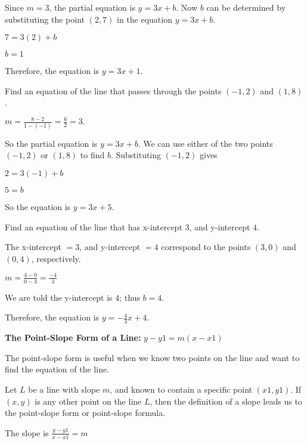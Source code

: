 \begin{solution}
Since $m = 3$, the partial equation is $y = 3x + b$. Now $b$ can be determined by substituting the point $(2, 7)$ in the equation $y = 3x + b$.

$7 = 3(2) + b$

$b = 1$

Therefore, the equation is $y = 3x + 1$.
\end{solution}

\begin{example}
Find an equation of the line that passes through the points $(-1, 2)$ and $(1, 8)$.
\end{example}

\begin{solution}
$m = \frac{8 - 2}{1 - (-1)} = \frac{6}{2} = 3.$

So the partial equation is $y = 3x + b$. We can use either of the two points $(-1, 2)$ or $(1, 8)$ to find $b$. Substituting $(-1, 2)$ gives

$2 = 3(-1) + b$

$5 = b$

So the equation is $y = 3x + 5$.
\end{solution}

\begin{example}
Find an equation of the line that has x-intercept $3$, and y-intercept $4$.
\end{example}

\begin{solution}
The x-intercept $= 3$, and y-intercept $= 4$ correspond to the points $(3, 0)$ and $(0, 4)$, respectively.

$m = \frac{4 - 0}{0 - 3} = \frac{-4}{3}$

We are told the y-intercept is $4$; thus $b = 4$.

Therefore, the equation is $y = -\frac{4}{3}x + 4$.
\end{solution}

\textbf{The Point-Slope Form of a Line:} $y - y1 = m(x - x1)$

The point-slope form is useful when we know two points on the line and want to find the equation of the line.

Let $L$ be a line with slope $m$, and known to contain a specific point $(x1, y1)$. If $(x, y)$ is any other point on the line $L$, then the definition of a slope leads us to the point-slope form or point-slope formula.

The slope is $\frac{y - y1}{x - x1} = m$

